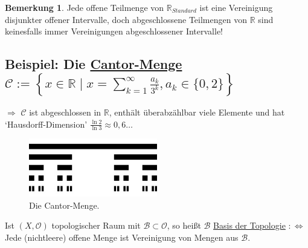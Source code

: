\documentclass[a4paper,11pt,notitlepage]{report}
\theoremstyle{definition}
\newtheorem{remark}{Bemerkung}[chapter]
\newcommand{\R}{{\ensuremath{\mathbb{R}}}}
\newcommand{\OO}{{\ensuremath{\mathcal{O}}}}
\newenvironment{bsp}[1]
{
\setlength{\fboxsep}{10pt}
\subsection*{Beispiel: #1}
\begin{upshape}
}
{
\end{upshape}
}
\newenvironment{definition}[1]{
	\begin{definitions}
	\marginnote{\emph{#1}}
}{\end{definitions}}
\begin{document}
\begin{remark}
	Jede offene Teilmenge von $\R_{Standard}$ ist eine Vereinigung disjunkter offener Intervalle, doch abgeschlossene Teilmengen von $\R$ sind keinesfalls immer Vereinigungen abgeschlossener Intervalle!
\end{remark}

\begin{bsp}{Die \underline{Cantor-Menge} $\mathcal{C}:= \left \{ x \in \R \mid x = \sum\limits_{k=1}^{\infty}{\frac{a_k}{3^k}}, a_k \in \{0,2\} \right \}$}
	$\Rightarrow$ $\mathcal{C}$ ist abgeschlossen in $\R$, enthält überabzählbar viele Elemente und hat `Hausdorff-Dimension' $\frac{\ln 2}{\ln 3} \approx 0,6 \ldots$
\end{bsp}

\begin{figure}[h]
\centering
\includegraphics[width=0.5\textwidth]{images/Cantormenge_5te_Iteration.jpg}
\caption{Die Cantor-Menge.}
\end{figure}

\begin{definition}{Basis}
	Ist $(X, \OO)$ topologischer Raum mit $\mathcal{B} \subset \OO$, 
	\newline
	so heißt $\mathcal{B}$ \underline{Basis der Topologie} $:\Leftrightarrow$ Jede (nichtleere) offene Menge ist Vereinigung von Mengen aus $\mathcal{B}$.
\end{definition}
\end{document}
